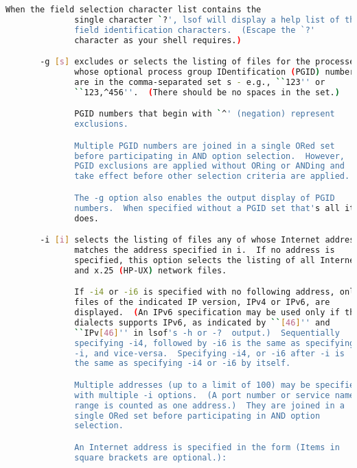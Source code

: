 {{\begin{lstlisting}[language=bash]
              When the field selection character list contains the
              single character `?', lsof will display a help list of the
              field identification characters.  (Escape the `?'
              character as your shell requires.)

       -g [s] excludes or selects the listing of files for the processes
              whose optional process group IDentification (PGID) numbers
              are in the comma-separated set s - e.g., ``123'' or
              ``123,^456''.  (There should be no spaces in the set.)

              PGID numbers that begin with `^' (negation) represent
              exclusions.

              Multiple PGID numbers are joined in a single ORed set
              before participating in AND option selection.  However,
              PGID exclusions are applied without ORing or ANDing and
              take effect before other selection criteria are applied.

              The -g option also enables the output display of PGID
              numbers.  When specified without a PGID set that's all it
              does.

       -i [i] selects the listing of files any of whose Internet address
              matches the address specified in i.  If no address is
              specified, this option selects the listing of all Internet
              and x.25 (HP-UX) network files.

              If -i4 or -i6 is specified with no following address, only
              files of the indicated IP version, IPv4 or IPv6, are
              displayed.  (An IPv6 specification may be used only if the
              dialects supports IPv6, as indicated by ``[46]'' and
              ``IPv[46]'' in lsof's -h or -?  output.)  Sequentially
              specifying -i4, followed by -i6 is the same as specifying
              -i, and vice-versa.  Specifying -i4, or -i6 after -i is
              the same as specifying -i4 or -i6 by itself.

              Multiple addresses (up to a limit of 100) may be specified
              with multiple -i options.  (A port number or service name
              range is counted as one address.)  They are joined in a
              single ORed set before participating in AND option
              selection.

              An Internet address is specified in the form (Items in
              square brackets are optional.):


\end{lstlisting}}}
